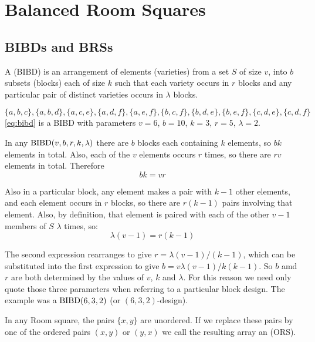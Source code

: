 \chapter{Balanced Room Squares}
\label{ch:balanced-room-squares}

\section{BIBDs and BRSs}

A  (BIBD) is an arrangement of elements (varieties) from a set $S$ of size $v$, into $b$ subsets (blocks) each of size $k$ such that each variety occurs in $r$ blocks and any particular pair of distinct varieties occurs in $\lambda$ blocks.

\begin{example}
\begin{equation}
\label{eq:bibd}
\{a,b,c\},\{a,b,d\},\{a,c,e\},\{a,d,f\},\{a,e,f\},\{b,c,f\},\{b,d,e\},\{b,e,f\},\{c,d,e\},\{c,d,f\}
\end{equation}
\eqref{eq:bibd} is a BIBD with parameters $v = 6$, $b = 10$, $k = 3$,
$r = 5$, $\lambda = 2$.
\end{example}

In any $\operatorname{BIBD}(v, b, r, k, \lambda)$ there are $b$ blocks each containing $k$ elements, so $bk$ elements in total.
Also, each of the $v$ elements occurs $r$ times, so there are $rv$ elements in total.
Therefore
\begin{equation}
bk = vr
\end{equation}

Also in a particular block, any element makes a pair with $k - 1$ other elements, and each element occurs in $r$ blocks, so there are $r(k - 1)$ pairs involving that element.
Also, by definition, that element is paired with each of the other $v - 1$ members of $S$ $\lambda$ times, so:
\begin{equation}
\lambda (v - 1) = r(k - 1)
\end{equation}

The second expression rearranges to give $r = \lambda (v - 1)/(k - 1)$, which can be substituted into the first expression to give $b = v\lambda (v - 1)/k(k - 1)$.
So $b$ amd $r$ are both determined by the values of $v$, $k$ and $\lambda$.
For this reason we need only quote those three parameters when referring to a particular block design.
The example was a $\operatorname{BIBD}(6, 3, 2)$ (or $(6, 3, 2)$-design).

In any Room square, the pairs $\{x, y\}$ are unordered.
If we replace these pairs by one of the ordered pairs $(x, y)$ or $(y, x)$ we call the resulting array an  (ORS).

